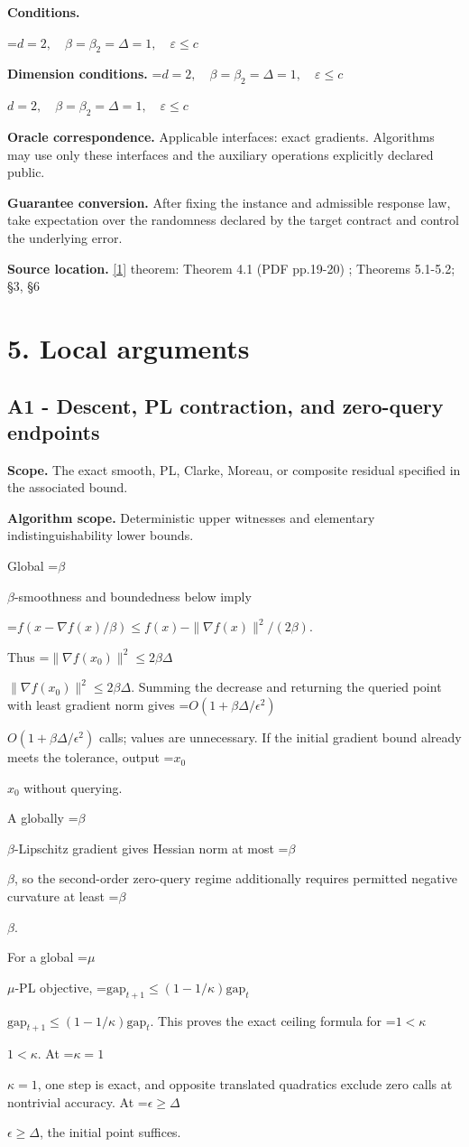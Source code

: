 \documentclass[10pt,a4paper]{article}
\newcommand{\AtlasMath}[1]{\par\begingroup\centering\setbox0=\hbox{$\displaystyle #1$}\ifdim\wd0>1.4\linewidth\typeout{ATLAS WIDE FORMULA: \the\wd0}\fi\ifdim\wd0>\linewidth\resizebox{\linewidth}{!}{\box0}\else\box0\fi\par\endgroup}
\newcommand{\AtlasInlineMath}[1]{\begingroup\setbox0=\hbox{$#1$}\ifdim\wd0>.4\linewidth\endgroup\AtlasMath{#1}\else\endgroup$#1$\fi}
\begin{document}
\textbf{Conditions.} 
\AtlasMath{d=2,\quad\beta=\beta_2=\Delta=1,\quad\varepsilon\le c}


\textbf{Dimension conditions.} \AtlasInlineMath{d=2,\quad\beta=\beta_2=\Delta=1,\quad\varepsilon\le c}

\textbf{Oracle correspondence.} Applicable interfaces: exact gradients. Algorithms may use only these interfaces and the auxiliary operations explicitly declared public.

\textbf{Guarantee conversion.} After fixing the instance and admissible response law, take expectation over the randomness declared by the target contract and control the underlying error.

\textbf{Source location.} \href{https://arxiv.org/pdf/2610.02791}{[1]} theorem: Theorem 4.1 (PDF pp.19-20) ; Theorems 5.1-5.2; §3, §6

\section{5. Local arguments}
\subsection{A1 - Descent, PL contraction, and zero-query endpoints}
\textbf{Scope.} The exact smooth, PL, Clarke, Moreau, or composite residual specified in the associated bound.

\textbf{Algorithm scope.} Deterministic upper witnesses and elementary indistinguishability lower bounds.

Global \AtlasInlineMath{\beta}-smoothness and boundedness below imply

\AtlasMath{f(x-\nabla f(x)/\beta)\le f(x)-\|\nabla f(x)\|^2/(2\beta).}

Thus \AtlasInlineMath{\|\nabla f(x_0)\|^2\le2\beta\Delta}. Summing the decrease and returning the queried point with least gradient norm gives \AtlasInlineMath{O(1+\beta\Delta/\epsilon^2)} calls; values are unnecessary. If the initial gradient bound already meets the tolerance, output \AtlasInlineMath{x_0} without querying.

A globally \AtlasInlineMath{\beta}-Lipschitz gradient gives Hessian norm at most \AtlasInlineMath{\beta}, so the second-order zero-query regime additionally requires permitted negative curvature at least \AtlasInlineMath{\beta}.

For a global \AtlasInlineMath{\mu}-PL objective,
\AtlasInlineMath{\mathrm{gap}_{t+1}\le(1-1/\kappa)\mathrm{gap}_t}.
This proves the exact ceiling formula for \AtlasInlineMath{1<\kappa}. At \AtlasInlineMath{\kappa=1}, one step is exact, and opposite translated quadratics exclude zero calls at nontrivial accuracy. At \AtlasInlineMath{\epsilon\ge\Delta}, the initial point suffices.
\end{document}
